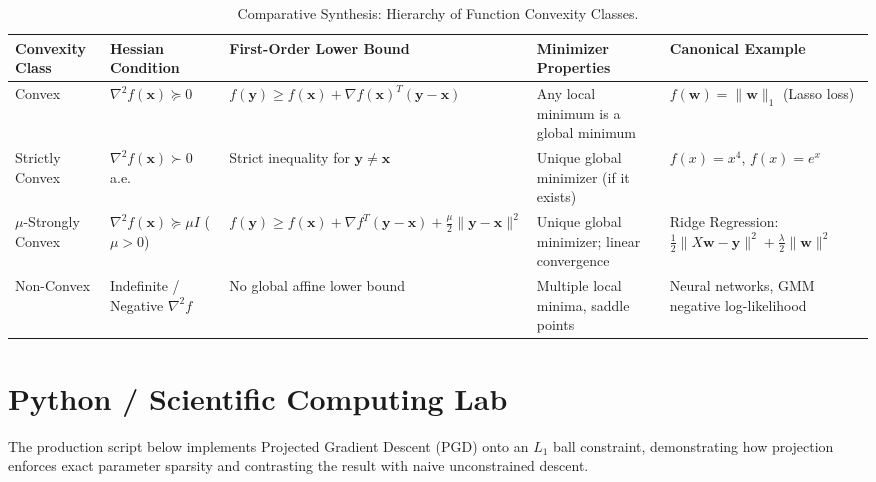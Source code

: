 \begin{table}[htbp]
\centering
\small
\begin{tabularx}{\textwidth}{lXXXX}
\toprule
\textbf{Convexity Class} & \textbf{Hessian Condition} & \textbf{First-Order Lower Bound} & \textbf{Minimizer Properties} & \textbf{Canonical Example} \\
\midrule
Convex & $\nabla^2 f(\mathbf{x}) \succeq 0$ & $f(\mathbf{y}) \ge f(\mathbf{x}) + \nabla f(\mathbf{x})^T(\mathbf{y} - \mathbf{x})$ & Any local minimum is a global minimum & $f(\mathbf{w}) = \|\mathbf{w}\|_1$ (Lasso loss) \\
\addlinespace
Strictly Convex & $\nabla^2 f(\mathbf{x}) \succ 0$ a.e. & Strict inequality for $\mathbf{y} \ne \mathbf{x}$ & Unique global minimizer (if it exists) & $f(x) = x^4$, $f(x) = e^x$ \\
\addlinespace
$\mu$-Strongly Convex & $\nabla^2 f(\mathbf{x}) \succeq \mu I$ ($\mu > 0$) & $f(\mathbf{y}) \ge f(\mathbf{x}) + \nabla f^T(\mathbf{y}-\mathbf{x}) + \frac{\mu}{2}\|\mathbf{y}-\mathbf{x}\|^2$ & Unique global minimizer; linear convergence & Ridge Regression: $\frac{1}{2}\|X\mathbf{w}-\mathbf{y}\|^2 + \frac{\lambda}{2}\|\mathbf{w}\|^2$ \\
\addlinespace
Non-Convex & Indefinite / Negative $\nabla^2 f$ & No global affine lower bound & Multiple local minima, saddle points & Neural networks, GMM negative log-likelihood \\
\bottomrule
\end{tabularx}
\caption{Comparative Synthesis: Hierarchy of Function Convexity Classes.}
\label{tab:convex_synthesis}
\end{table}

\section{Python / Scientific Computing Lab}

The production script below implements Projected Gradient Descent (PGD) onto an $L_1$ ball constraint, demonstrating how projection enforces exact parameter sparsity and contrasting the result with naive unconstrained descent.

